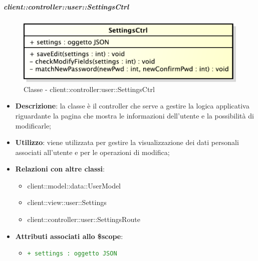 		\subparagraph{client::controller::user::SettingsCtrl} %
		\label{subp:client_controller_user_settingsctrl}
			\begin{figure}[htbp]
				\centering
				\centerline{\includegraphics[scale=0.7]{./images/client/classes/controller/settings_ctrl.pdf}}
				\caption{Classe - client::controller:user::SettingsCtrl}
			\end{figure}
			\begin{itemize}
				\item \textbf{Descrizione}: la classe è il controller che serve a gestire la logica applicativa riguardante la pagina che mostra le informazioni dell'utente e la possibilità di modificarle;
				\item \textbf{Utilizzo}: viene utilizzata per gestire la visualizzazione dei dati personali associati all'utente e per le operazioni di modifica;
				\item \textbf{Relazioni con altre classi}:
					\begin{itemize}
						\item client::model::data::UserModel
						\item client::view::user::Settings
						\item client::controller::user::SettingsRoute
					\end{itemize}

				\item \textbf{Attributi associati allo \$scope}:
					\begin{itemize}
						\item \textcolor{forestgreen}{\texttt{+ settings : oggetto JSON}}
						\end{itemize}


\end{itemize}
